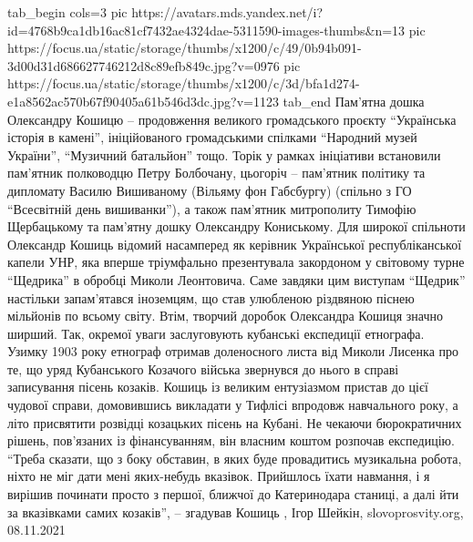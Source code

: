  
 
 
 
 

\ifcmt
  tab_begin cols=3
     pic https://avatars.mds.yandex.net/i?id=4768b9ca1db16ac81cf7432ae4324dae-5311590-images-thumbs&n=13
     pic https://focus.ua/static/storage/thumbs/x1200/c/49/0b94b091-3d00d31d686627746212d8c89efb849c.jpg?v=0976
		 pic https://focus.ua/static/storage/thumbs/x1200/c/3d/bfa1d274-e1a8562ac570b67f90405a61b546d3dc.jpg?v=1123
  tab_end
\fi
Пам’ятна дошка Олександру Кошицю – продовження великого громадського проєкту
\enquote{Українська історія в камені}, ініційованого громадськими спілками \enquote{Народний
музей України}, \enquote{Музичний батальйон} тощо.  Торік у рамках ініціативи
встановили пам’ятник полководцю Петру Болбочану, цьогоріч – пам’ятник політику
та дипломату Василю Вишиваному (Вільяму фон Габсбургу) (спільно з ГО
\enquote{Всесвітній день вишиванки}), а також пам’ятник митрополиту Тимофію Щербацькому
та пам’ятну дошку Олександру Кониському.  Для широкої спільноти Олександр
Кошиць відомий насамперед як керівник Української республіканської капели УНР,
яка вперше тріумфально презентувала закордоном у світовому турне \enquote{Щедрика} в
обробці Миколи Леонтовича. Саме завдяки цим виступам \enquote{Щедрик} настільки
запам’ятався іноземцям, що став улюбленою різдвяною піснею мільйонів по всьому
світу.  Втім, творчий доробок Олександра Кошиця значно ширший. Так, окремої
уваги заслуговують кубанські експедиції етнографа.  Узимку 1903 року етнограф
отримав доленосного листа від Миколи Лисенка про те, що уряд Кубанського
Козачого війська звернувся до нього в справі записування пісень козаків. Кошиць
із великим ентузіазмом пристав до цієї чудової справи, домовившись викладати у
Тифлісі впродовж навчального року, а літо присвятити розвідці козацьких пісень
на Кубані. Не чекаючи бюрократичних рішень, пов’язаних із фінансуванням, він
власним коштом розпочав експедицію. \enquote{Треба сказати, що з боку обставин, в яких
буде провадитись музикальна робота, ніхто не міг дати мені яких-небудь
вказівок. Прийшлось їхати навмання, і я вирішив починати просто з першої,
ближчої до Катеринодара станиці, а далі йти за вказівками самих козаків}, –
згадував Кошиць
, 
Ігор Шейкін, slovoprosvity.org, 08.11.2021 
